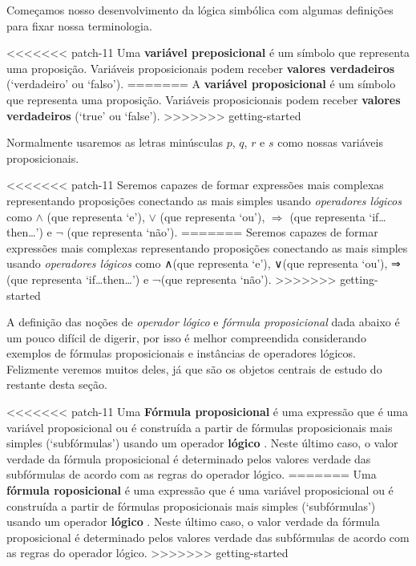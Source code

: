 Começamos nosso desenvolvimento da lógica simbólica com algumas definições para fixar nossa terminologia.

\begin{definition}
\label{defPropositionalVariable}
<<<<<<< patch-11
Uma \textbf{variável preposicional} é um símbolo que representa uma proposição. Variáveis ​​proposicionais podem receber \textbf{valores verdadeiros} (`verdadeiro' ou `falso').
=======
A \textbf{variável proposicional} é um símbolo que representa uma proposição. Variáveis ​​proposicionais podem receber \textbf{valores verdadeiros} (`true' ou `false').
>>>>>>> getting-started
\end{definition}

Normalmente usaremos as letras minúsculas $p$, $q$, $r$ e $s$ como nossas variáveis ​​proposicionais.

<<<<<<< patch-11
Seremos capazes de formar expressões mais complexas representando proposições conectando as mais simples usando \textit{operadores lógicos} como $\wedge$ (que representa `e'), $\vee$ (que representa `ou'), $ \Rightarrow$ (que representa `if\dots{}then\dots{}') e $\neg$ (que representa `não').
=======
Seremos capazes de formar expressões mais complexas representando proposições conectando as mais simples usando \textit{operadores lógicos} como ∧\wedge (que representa `e'), ∨\vee (que representa `ou'), ⇒ \Rightarrow (que representa `if\dots{}then\dots{}') e ¬\neg (que representa `não').
>>>>>>> getting-started

A definição das noções de \textit{operador lógico} e \textit{fórmula proposicional} dada abaixo é um pouco difícil de digerir, por isso é melhor compreendida considerando exemplos de fórmulas proposicionais e instâncias de operadores lógicos. Felizmente veremos muitos deles, já que são os objetos centrais de estudo do restante desta seção.

\begin{definition}
\label{defPropositionalFormula}
\label{defLogicalOperator}
<<<<<<< patch-11
Uma \textbf{Fórmula proposicional} é uma expressão que é uma variável proposicional ou é construída a partir de fórmulas proposicionais mais simples (`subfórmulas') usando um operador \textbf{\mbox{lógico} \mbox{}}. Neste último caso, o valor verdade da fórmula proposicional é determinado pelos valores verdade das subfórmulas de acordo com as regras do operador lógico.
=======
Uma \textbf{fórmula roposicional} é uma expressão que é uma variável proposicional ou é construída a partir de fórmulas proposicionais mais simples (`subfórmulas') usando um operador \textbf{\mbox{lógico} \mbox{}}. Neste último caso, o valor verdade da fórmula proposicional é determinado pelos valores verdade das subfórmulas de acordo com as regras do operador lógico.
>>>>>>> getting-started
\end{definition}

